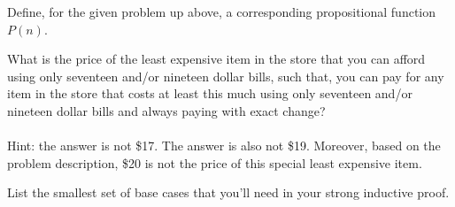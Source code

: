 \documentclass[12pt]{exam}
\begin{document}
\clearpage

\begin{questions}

	\question[1] Define, for the given problem up above, a corresponding propositional function $P(n)$.
		
		
\clearpage

	\question[1] What is the price of the least expensive item in the store that you can afford using only seventeen and/or nineteen dollar bills, such that, you can pay for any item in the store that costs at least this much using only seventeen and/or nineteen dollar bills and always paying with exact change? \\
	\\
	Hint: the answer is not \$17. The answer is also not \$19. Moreover, based on the problem description, \$20 is not the price of this special least expensive item. 
		
		
\clearpage


	\question[1] List the smallest set of base cases that you'll need in your strong inductive proof.
		
\end{questions}
\end{document}
